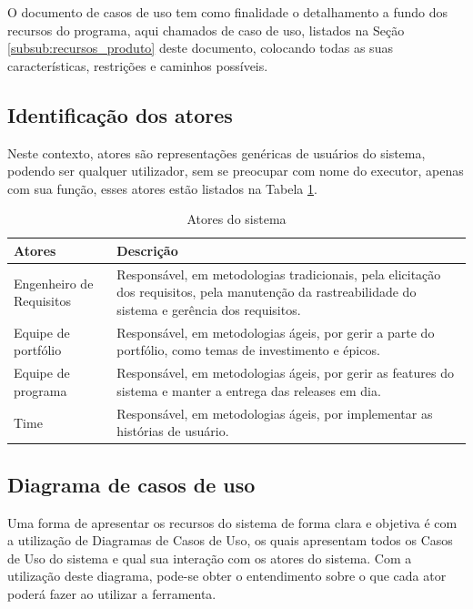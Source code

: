
O documento de casos de uso tem como finalidade o detalhamento a fundo dos recursos do programa, aqui chamados de caso de uso, listados na Seção \ref{subsub:recursos_produto} deste documento, colocando todas as suas características, restrições e caminhos possíveis.

\subsection{Identificação dos atores}

Neste contexto, atores são representações genéricas de usuários do sistema, podendo ser qualquer utilizador, sem se preocupar com nome do executor, apenas com sua função, esses atores estão listados na Tabela \ref{tab:atores}.

\begin{table}[H]
\centering
\begin{tabular}{|l|p{8cm}|}

\hline
\textbf{Atores} &
\textbf{Descrição}
\\ \hline
Engenheiro de Requisitos &
Responsável, em metodologias tradicionais, pela elicitação dos requisitos, pela manutenção da rastreabilidade do sistema e gerência dos requisitos.
\\ \hline
Equipe de portfólio &
Responsável, em metodologias ágeis, por gerir a parte do portfólio, como temas de investimento e épicos.
\\ \hline
Equipe de programa &
Responsável, em metodologias ágeis, por gerir as features do sistema e manter a entrega das releases em dia.
\\ \hline
Time &
Responsável, em metodologias ágeis, por implementar as histórias de usuário.
\\ \hline

\end{tabular}
\caption{Atores do sistema}
\label{tab:atores}
\end{table}

\subsection{Diagrama de casos de uso}

Uma forma de apresentar os recursos do sistema de forma clara e objetiva é com a utilização de Diagramas de Casos de Uso, os quais apresentam todos os Casos de Uso do sistema e qual sua interação com os atores do sistema. Com a utilização deste diagrama, pode-se obter o entendimento sobre o que cada ator poderá fazer ao utilizar a ferramenta.

